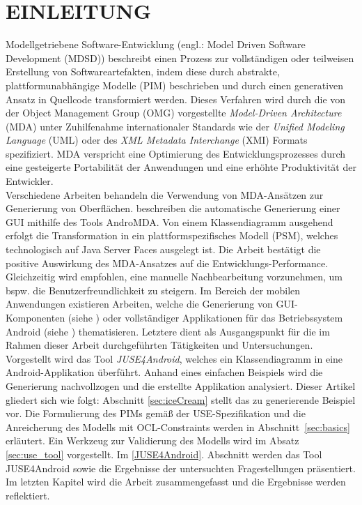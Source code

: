 \documentclass[a4paper,twoside]{article}
\begin{document}
\section{\uppercase{Einleitung}}
\label{sec:introduction}
\noindent Modellgetriebene Software-Entwicklung (engl.: Model Driven Software Development (MDSD))  beschreibt einen Prozess zur vollständigen oder teilweisen Erstellung von Softwareartefakten, indem diese durch abstrakte, plattformunabhängige Modelle (PIM) beschrieben und durch einen generativen Ansatz in Quellcode transformiert werden. Dieses Verfahren wird durch die von der Object Management Group (OMG) vorgestellte \textit{Model-Driven Architecture} (MDA) unter Zuhilfenahme internationaler Standards wie der \textit{Unified Modeling Language} (UML) oder des \textit{XML Metadata Interchange} (XMI) Formats spezifiziert. MDA verspricht eine Optimierung des Entwicklungsprozesses durch eine gesteigerte Portabilität der Anwendungen und eine erhöhte Produktivität der Entwickler. \citep{OMG_MDA}
\\

Verschiedene Arbeiten behandeln die Verwendung von MDA-Ansätzen zur Generierung von Oberflächen. \cite{GUI_MDA} beschreiben die automatische Generierung einer GUI mithilfe des Tools AndroMDA. Von einem Klassendiagramm ausgehend erfolgt die Transformation in ein plattformspezifisches Modell (PSM), welches technologisch auf Java Server Faces ausgelegt ist. Die Arbeit bestätigt die positive Auswirkung des MDA-Ansatzes auf die Entwicklungs-Performance. Gleichzeitig wird empfohlen, eine manuelle Nachbearbeitung vorzunehmen, um bspw. die Benutzerfreundlichkeit zu steigern.
Im Bereich der mobilen Anwendungen existieren Arbeiten, welche die Generierung von GUI-Komponenten (siehe \cite{GUI_MDA_Android}) oder vollständiger Applikationen für das Betriebssystem Android (siehe \cite{JUSE}) thematisieren. Letztere dient als Ausgangspunkt für die im Rahmen dieser Arbeit durchgeführten Tätigkeiten und Untersuchungen. Vorgestellt wird das Tool \textit{JUSE4Android}, welches ein Klassendiagramm in eine Android-Applikation überführt. Anhand eines einfachen Beispiels wird die Generierung nachvollzogen und die erstellte Applikation analysiert. Dieser Artikel gliedert sich wie folgt: Abschnitt \ref{sec:iceCream} stellt das zu generierende Beispiel vor. Die Formulierung des PIMs gemäß der USE-Spezifikation und die Anreicherung des Modells mit OCL-Constraints werden in Abschnitt~\ref{sec:basics} erläutert. Ein Werkzeug zur Validierung des Modells wird im  Absatz \ref{sec:use_tool} vorgestellt. Im \ref{JUSE4Android}. Abschnitt werden das Tool JUSE4Android sowie die Ergebnisse der untersuchten Fragestellungen präsentiert. Im letzten Kapitel wird die Arbeit zusammengefasst und die Ergebnisse werden reflektiert.
\end{document}
